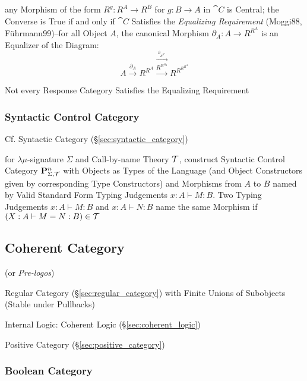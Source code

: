any Morphism of the form $R^g : R^A \rightarrow R^B$ for $g : B
\rightarrow A$ in $\cat{C}$ is Central; the Converse is True if and
only if $\cat{C}$ Satisfies the \emph{Equalizing Requirement}
(Moggi88, F\"uhrmann99)--for all Object $A$, the canonical Morphism
$\partial_A : A \rightarrow R^{R^A}$ is an Equalizer of the Diagram:
\[
  A \xrightarrow{\partial_A} R^{R^A}
    \stackrel{\xrightarrow{\partial_{R^{R^A}}}}
    {\xrightarrow{R^{R^{\partial_A}}}}
  R^{R^{R^{R^A}}}
\]

\fist Not every Response Category Satisfies the Equalizing Requirement



\subsubsection{Syntactic Control Category}
\label{sec:syntactic_control_category}

\fist Cf. Syntactic Category (\S\ref{sec:syntactic_category})

for $\lambda\mu$-signature $\Sigma$ and Call-by-name Theory
$\mathcal{T}$, construct Syntactic Control Category
$\mathbf{P}^n_{\Sigma,\mathcal{T}}$ with Objects as Types of the Language
(and Object Constructors given by corresponding Type Constructors) and
Morphisms from $A$ to $B$ named by Valid Standard Form Typing
Judgements $x:A \vdash M:B$. Two Typing Judgements $x:A \vdash M:B$
and $x:A \vdash N:B$ name the same Morphism if $(X:A \vdash M=N:B) \in
\mathcal{T}$




\subsection{Coherent Category}\label{sec:coherent_category}

(or \emph{Pre-logos})

Regular Category (\S\ref{sec:regular_category}) with Finite Unions of
Subobjects (Stable under Pullbacks)

Internal Logic: Coherent Logic (\S\ref{sec:coherent_logic})

Positive Category (\S\ref{sec:positive_category})



\subsubsection{Boolean Category}\label{sec:boolean_category}

